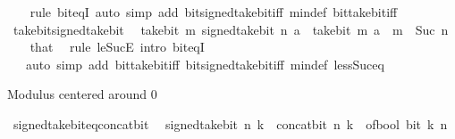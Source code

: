 \begin{isabellebody}
%
\isadelimproof
\ \ %
\endisadelimproof
%
\isatagproof
{}\isamarkupfalse%
\ {\isacharparenleft}{\kern0pt}rule\ bit{\isacharunderscore}{\kern0pt}eqI{\isacharparenright}{\kern0pt}\ {\isacharparenleft}{\kern0pt}auto\ simp\ add{\isacharcolon}{\kern0pt}\ bit{\isacharunderscore}{\kern0pt}signed{\isacharunderscore}{\kern0pt}take{\isacharunderscore}{\kern0pt}bit{\isacharunderscore}{\kern0pt}iff\ min{\isacharunderscore}{\kern0pt}def\ bit{\isacharunderscore}{\kern0pt}take{\isacharunderscore}{\kern0pt}bit{\isacharunderscore}{\kern0pt}iff{\isacharparenright}{\kern0pt}%
\endisatagproof
{\isafoldproof}%
%
\isadelimproof
\isanewline
%
\endisadelimproof
\isanewline
{}\isamarkupfalse%
\ take{\isacharunderscore}{\kern0pt}bit{\isacharunderscore}{\kern0pt}signed{\isacharunderscore}{\kern0pt}take{\isacharunderscore}{\kern0pt}bit{\isacharcolon}{\kern0pt}\isanewline
\ \ {\isacartoucheopen}take{\isacharunderscore}{\kern0pt}bit\ m\ {\isacharparenleft}{\kern0pt}signed{\isacharunderscore}{\kern0pt}take{\isacharunderscore}{\kern0pt}bit\ n\ a{\isacharparenright}{\kern0pt}\ {\isacharequal}{\kern0pt}\ take{\isacharunderscore}{\kern0pt}bit\ m\ a{\isacartoucheclose}\ \ {\isacartoucheopen}m\ {\isasymle}\ Suc\ n{\isacartoucheclose}\isanewline
%
\isadelimproof
\ \ %
\endisadelimproof
%
\isatagproof
{}\isamarkupfalse%
\ that\ \isamarkupfalse%
\ {\isacharparenleft}{\kern0pt}rule\ le{\isacharunderscore}{\kern0pt}SucE{\isacharsemicolon}{\kern0pt}\ intro\ bit{\isacharunderscore}{\kern0pt}eqI{\isacharparenright}{\kern0pt}\isanewline
\ \ \ {\isacharparenleft}{\kern0pt}auto\ simp\ add{\isacharcolon}{\kern0pt}\ bit{\isacharunderscore}{\kern0pt}take{\isacharunderscore}{\kern0pt}bit{\isacharunderscore}{\kern0pt}iff\ bit{\isacharunderscore}{\kern0pt}signed{\isacharunderscore}{\kern0pt}take{\isacharunderscore}{\kern0pt}bit{\isacharunderscore}{\kern0pt}iff\ min{\isacharunderscore}{\kern0pt}def\ less{\isacharunderscore}{\kern0pt}Suc{\isacharunderscore}{\kern0pt}eq{\isacharparenright}{\kern0pt}%
\endisatagproof
{\isafoldproof}%
%
\isadelimproof
\isanewline
%
\endisadelimproof
\isanewline
{}\isamarkupfalse%
%
\begin{isamarkuptext}%
Modulus centered around 0%
\end{isamarkuptext}\isamarkuptrue%
\isamarkupfalse%
\ signed{\isacharunderscore}{\kern0pt}take{\isacharunderscore}{\kern0pt}bit{\isacharunderscore}{\kern0pt}eq{\isacharunderscore}{\kern0pt}concat{\isacharunderscore}{\kern0pt}bit{\isacharcolon}{\kern0pt}\isanewline
\ \ {\isacartoucheopen}signed{\isacharunderscore}{\kern0pt}take{\isacharunderscore}{\kern0pt}bit\ n\ k\ {\isacharequal}{\kern0pt}\ concat{\isacharunderscore}{\kern0pt}bit\ n\ k\ {\isacharparenleft}{\kern0pt}{\isacharminus}{\kern0pt}\ of{\isacharunderscore}{\kern0pt}bool\ {\isacharparenleft}{\kern0pt}bit\ k\ n{\isacharparenright}{\kern0pt}{\isacharparenright}{\kern0pt}{\isacartoucheclose}\isanewline

\end{isabellebody}
